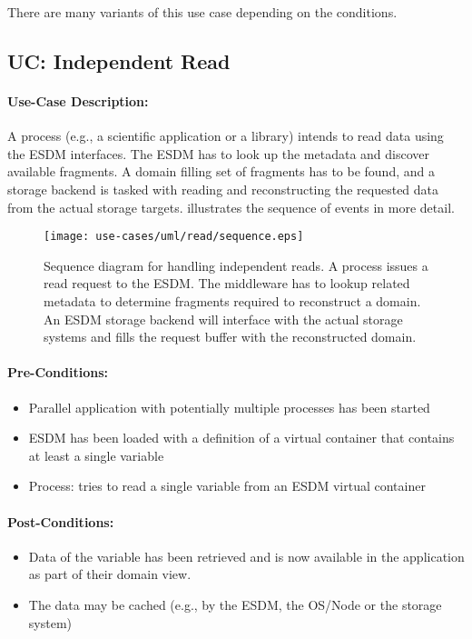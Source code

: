 There are many variants of this use case depending on the conditions.






\subsection{UC: Independent Read}
\label{uc: independent read}

\paragraph{Use-Case Description:}
A process (e.g., a scientific application or a library) intends to read data using the ESDM interfaces.
The ESDM has to look up the metadata and discover available fragments. A domain filling set of fragments has to be found, and a storage backend is tasked with reading and reconstructing the requested data from the actual storage targets.
 illustrates the sequence of events in more detail.


\begin{figure}
	\centering
	\texttt{[image: use-cases/uml/read/sequence.eps]}
	\caption{Sequence diagram for handling independent reads. A process issues a read request to the ESDM. The middleware has to lookup related metadata to determine fragments required to reconstruct a domain. An ESDM storage backend will interface with the actual storage systems and fills the request buffer with the reconstructed domain.}
	\label{fig:sequence independent read}
\end{figure}



\paragraph{Pre-Conditions:}

\begin{itemize}
	\item Parallel application with potentially multiple processes has been started
	\item ESDM has been loaded with a definition of a virtual container that contains at least a single variable
	\item Process: tries to read a single variable from an ESDM virtual container
\end{itemize}

\paragraph{Post-Conditions:}
\begin{itemize}
	\item Data of the variable has been retrieved and is now available in the application as part of their domain view.
	\item The data may be cached (e.g., by the ESDM, the OS/Node or the storage system)
\end{itemize}

